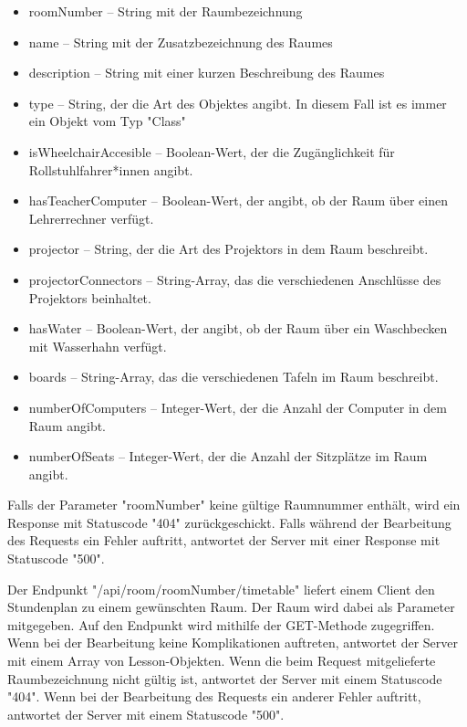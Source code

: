 \begin{itemize}
    \item roomNumber -- String mit der Raumbezeichnung
    \item name -- String mit der Zusatzbezeichnung des Raumes
    \item description -- String mit einer kurzen Beschreibung des Raumes
    \item type -- String, der die Art des Objektes angibt. In diesem Fall ist es immer ein Objekt vom Typ "Class"
    \item isWheelchairAccesible -- Boolean-Wert, der die Zugänglichkeit für Rollstuhlfahrer*innen angibt.
    \item hasTeacherComputer -- Boolean-Wert, der angibt, ob der Raum über einen Lehrerrechner verfügt.
    \item projector -- String, der die Art des Projektors in dem Raum beschreibt.
    \item projectorConnectors -- String-Array, das die verschiedenen Anschlüsse des Projektors beinhaltet.
    \item hasWater -- Boolean-Wert, der angibt, ob der Raum über ein Waschbecken mit Wasserhahn verfügt. 
    \item boards -- String-Array, das die verschiedenen Tafeln im Raum beschreibt.
    \item numberOfComputers -- Integer-Wert, der die Anzahl der Computer in dem Raum angibt.
    \item numberOfSeats -- Integer-Wert, der die Anzahl der Sitzplätze im Raum angibt.
\end{itemize}

Falls der Parameter "roomNumber" keine gültige Raumnummer enthält, wird ein Response mit Statuscode "404" zurückgeschickt. 
Falls während der Bearbeitung des Requests ein Fehler auftritt, antwortet der Server mit einer Response mit Statuscode "500".


Der Endpunkt "/api/room/{roomNumber}/timetable" liefert einem Client den Stundenplan zu einem gewünschten Raum. Der Raum wird dabei als Parameter mitgegeben. Auf den Endpunkt wird mithilfe der GET-Methode zugegriffen. Wenn bei der Bearbeitung keine Komplikationen auftreten, antwortet der Server mit einem Array von Lesson-Objekten. Wenn die beim Request mitgelieferte Raumbezeichnung nicht gültig ist, antwortet der Server mit einem Statuscode "404". Wenn bei der Bearbeitung des Requests ein anderer Fehler auftritt, antwortet der Server mit einem Statuscode "500".

